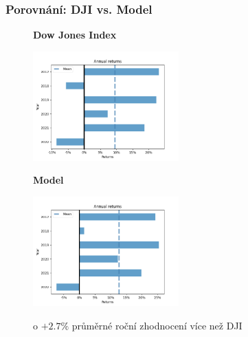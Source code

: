 \begin{frame}
    \frametitle{Porovnání: DJI vs. Model}
    \begin{multicols}{2}
        \begin{figure}
            \centering
            \textbf{Dow Jones Index}

            \includegraphics[width=0.5\textwidth]{img/annual_returns_dji}
        \end{figure}
        \columnbreak
        \begin{figure}
            \centering
            \textbf{Model}

            \includegraphics[width=0.5\textwidth]{img/annual_returns_max}

            o $+2.7\%$ průměrné roční zhodnocení více než DJI
        \end{figure}
    \end{multicols}
\end{frame}


